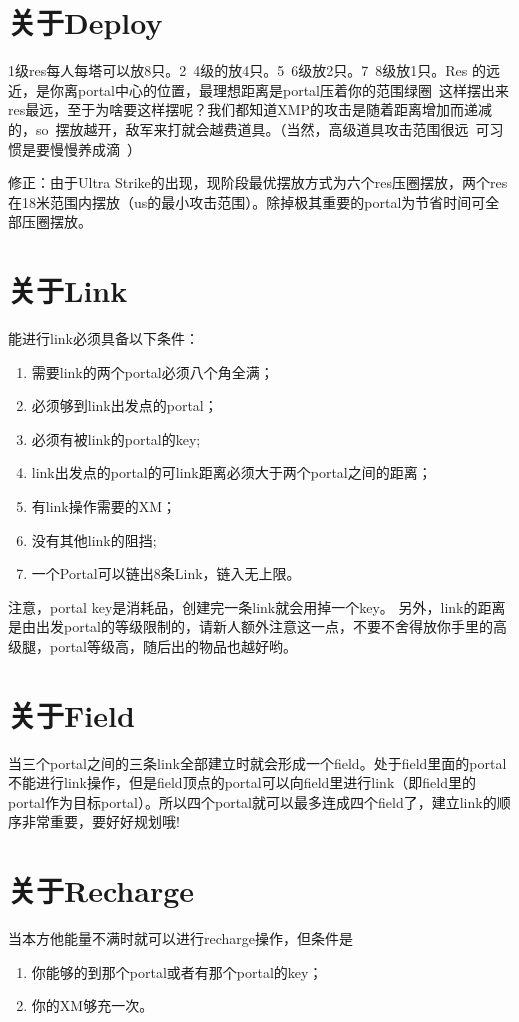 \documentclass[a4paper]{article}
\begin{document}
\section{关于Deploy}
1级res每人每塔可以放8只。2~4级的放4只。5~6级放2只。7~8级放1只。Res 的远近，是你离portal中心的位置，最理想距离是portal压着你的范围绿圈~这样摆出来res最远，至于为啥要这样摆呢？我们都知道XMP的攻击是随着距离增加而递减的，so~摆放越开，敌军来打就会越费道具。（当然，高级道具攻击范围很远~可习惯是要慢慢养成滴~）\par
修正：由于Ultra Strike的出现，现阶段最优摆放方式为六个res压圈摆放，两个res在18米范围内摆放（us的最小攻击范围）。除掉极其重要的portal为节省时间可全部压圈摆放。

\section{关于Link}
能进行link必须具备以下条件：
\begin{enumerate}
\item 需要link的两个portal必须八个角全满；
\item 必须够到link出发点的portal；
\item 必须有被link的portal的key;
\item link出发点的portal的可link距离必须大于两个portal之间的距离；
\item 有link操作需要的XM；
\item 没有其他link的阻挡;
\item 一个Portal可以链出8条Link，链入无上限。
\end{enumerate}
注意，portal key是消耗品，创建完一条link就会用掉一个key。
另外，link的距离是由出发portal的等级限制的，请新人额外注意这一点，不要不舍得放你手里的高级腿，portal等级高，随后出的物品也越好哟。

\section{关于Field}
当三个portal之间的三条link全部建立时就会形成一个field。处于field里面的portal不能进行link操作，但是field顶点的portal可以向field里进行link（即field里的portal作为目标portal）。所以四个portal就可以最多连成四个field了，建立link的顺序非常重要，要好好规划哦!

\section{关于Recharge}
当本方他能量不满时就可以进行recharge操作，但条件是
\begin{enumerate}
\item 你能够的到那个portal或者有那个portal的key；
\item 你的XM够充一次。

\end{enumerate}
\end{document}
